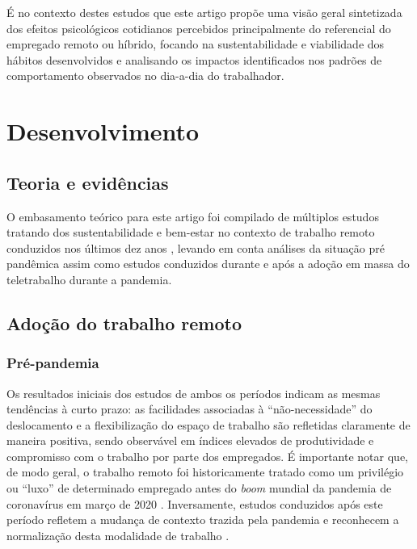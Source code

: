 \documentclass[12pt]{article}
\begin{document}
É no contexto destes estudos que este artigo propõe uma visão geral sintetizada dos efeitos psicológicos cotidianos percebidos
principalmente do referencial do empregado remoto ou híbrido, focando na sustentabilidade e viabilidade dos hábitos
desenvolvidos e analisando os impactos identificados nos padrões de comportamento observados no dia-a-dia do
trabalhador.

\section{Desenvolvimento}
\subsection{Teoria e evidências}

O embasamento teórico para este artigo foi compilado de múltiplos estudos tratando dos sustentabilidade e bem-estar no 
contexto de trabalho remoto conduzidos nos últimos dez anos \cite{mckinsey2022,ijerph2021,ntwe2017,forbes2023},
levando em conta análises da situação pré pandêmica \cite{ntwe2017} assim como estudos conduzidos durante e após a
adoção em massa do teletrabalho durante a pandemia\cite{mckinsey2022,ijerph2021,sustainability2022}. 

\subsection{Adoção do trabalho remoto}
\subsubsection{Pré-pandemia}

Os resultados iniciais dos estudos de ambos os períodos indicam as mesmas tendências à curto prazo: as facilidades associadas à
``não-necessidade'' do deslocamento e a flexibilização do espaço de trabalho são refletidas claramente de maneira positiva,
sendo observável em índices elevados de produtividade e compromisso com o trabalho \cite{ntwe2017} por parte dos
empregados. É importante notar que, de modo geral, o trabalho remoto foi historicamente tratado como um privilégio ou ``luxo'' de
determinado empregado antes do \textit{boom} mundial da pandemia de coronavírus em março de 2020 
\cite{ntwe2017,sustainability2022,diMartino1990}. Inversamente, estudos conduzidos após este período refletem a mudança
de contexto trazida pela pandemia e reconhecem a normalização desta modalidade de trabalho
\cite{hofschulteBeck2022,sustainability2022}.
\end{document}
